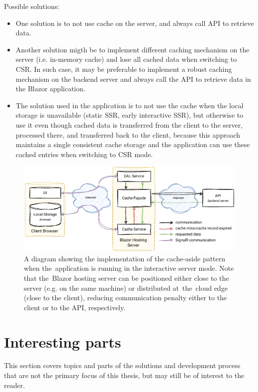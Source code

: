 Possible solutions:
\begin{itemize}
    \item One solution is to not use cache on the server, and always call API to retrieve data.
    
    \item Another solution migth be to implement different caching mechanism on the server (i.e. in-memory cache) and lose all cached data when switching to CSR. In such case, it may be preferable to implement a robust caching mechanism on the backend server and always call the API to retrieve data in the Blazor application.

    \item The solution used in the application is to not use the cache when the local storage is unavailable (static SSR, early interactive SSR), but otherwise to use it even though cached data is transferred from the client to the server, processed there, and transferred back to the client, because this approach maintains a single consistent cache storage and the application can use these cached entries when switching to CSR mode.
\end{itemize}

\begin{figure} [H]
    \centering
    \includegraphics[width=\textwidth]{figures/server-cache.pdf}
    \caption{A diagram showing the implementation of the cache-aside pattern when the~application is running in the interactive server mode. Note that the~Blazor hosting server can be positioned either close to the server (e.g. on the same machine) or distributed at~the~cloud edge (close to the client), reducing communication penalty either to the client or to the API, respectively.}
    \label{fig:server-cache}
\end{figure}

\newpage
\section{Interesting parts}
\label{dev:interesting}
This section covers topics and parts of the solutions and development process that are not the primary focus of this thesis, but may still be of interest to the reader.

